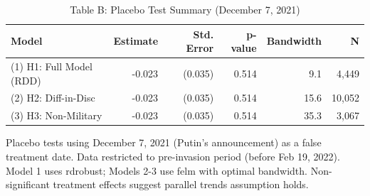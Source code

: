 \begin{table}[!t]
\caption*{
{\large Table B: Placebo Test Summary (December 7, 2021)}
} 
\fontsize{12.0pt}{14.4pt}\selectfont
\begin{tabular*}{\linewidth}{@{\extracolsep{\fill}}lrrrrr}
\toprule
Model & Estimate & Std. Error & p-value & Bandwidth & N \\ 
\midrule\addlinespace[2.5pt]
(1) H1: Full Model (RDD) & -0.023 & (0.035) & 0.514 & 9.1 &  4,449 \\ 
(2) H2: Diff-in-Disc & -0.023 & (0.035) & 0.514 & 15.6 & 10,052 \\ 
(3) H3: Non-Military & -0.023 & (0.035) & 0.514 & 35.3 &  3,067 \\ 
\bottomrule
\end{tabular*}
\begin{minipage}{\linewidth}
Placebo tests using December 7, 2021 (Putin's announcement) as a false treatment
date. Data restricted to pre-invasion period (before Feb 19, 2022). Model 1 uses
rdrobust; Models 2-3 use felm with optimal bandwidth. Non-significant treatment
effects suggest parallel trends assumption holds.\\
\end{minipage}
\end{table}

